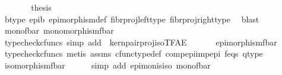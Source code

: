 \begin{isabellebody}
\ \ \ \ \isamarkupfalse%
\ \isamarkupfalse%
\ {\isacharquery}{\kern0pt}thesis\isanewline
\ \ \ \ \ \ \isamarkupfalse%
\ b{\isacharunderscore}{\kern0pt}type\ epi{\isacharunderscore}{\kern0pt}b\ epimorphism{\isacharunderscore}{\kern0pt}def{}\ fibr{\isacharunderscore}{\kern0pt}proj{\isacharunderscore}{\kern0pt}left{\isacharunderscore}{\kern0pt}type\ fibr{\isacharunderscore}{\kern0pt}proj{\isacharunderscore}{\kern0pt}right{\isacharunderscore}{\kern0pt}type\ \isamarkupfalse%
\ blast\isanewline
\ \ \isamarkupfalse%
\isanewline
\ \ \isanewline
\ \ \isamarkupfalse%
\ \isamarkupfalse%
\ mono{\isacharunderscore}{\kern0pt}fbar{\isacharcolon}{\kern0pt}\ {\isachardoublequoteopen}monomorphism{\isacharparenleft}{\kern0pt}f{\isacharunderscore}{\kern0pt}bar{\isacharparenright}{\kern0pt}{\isachardoublequoteclose}\isanewline
\ \ \ \ \isamarkupfalse%
\ {\isacharparenleft}{\kern0pt}typecheck{\isacharunderscore}{\kern0pt}cfuncs{\isacharcomma}{\kern0pt}\ simp\ add{\isacharcolon}{\kern0pt}\ \ kern{\isacharunderscore}{\kern0pt}pair{\isacharunderscore}{\kern0pt}proj{\isacharunderscore}{\kern0pt}iso{\isacharunderscore}{\kern0pt}TFAE{}{\isacharparenright}{\kern0pt}\isanewline
\ \ \isanewline
\ \ \isamarkupfalse%
\ {\isachardoublequoteopen}epimorphism{\isacharparenleft}{\kern0pt}f{\isacharunderscore}{\kern0pt}bar{\isacharparenright}{\kern0pt}{\isachardoublequoteclose}\isanewline
\ \ \ \ \isamarkupfalse%
\ {\isacharparenleft}{\kern0pt}typecheck{\isacharunderscore}{\kern0pt}cfuncs{\isacharcomma}{\kern0pt}\ metis\ assms{\isacharparenleft}{\kern0pt}{}{\isacharparenright}{\kern0pt}\ cfunc{\isacharunderscore}{\kern0pt}type{\isacharunderscore}{\kern0pt}def\ comp{\isacharunderscore}{\kern0pt}epi{\isacharunderscore}{\kern0pt}imp{\isacharunderscore}{\kern0pt}epi\ f{\isacharunderscore}{\kern0pt}eqs\ q{\isacharunderscore}{\kern0pt}type{\isacharparenright}{\kern0pt}\isanewline
\ \ \isanewline
\ \ \isamarkupfalse%
\ \isamarkupfalse%
\ {\isachardoublequoteopen}isomorphism{\isacharparenleft}{\kern0pt}f{\isacharunderscore}{\kern0pt}bar{\isacharparenright}{\kern0pt}{\isachardoublequoteclose}\isanewline
\ \ \ \ \isamarkupfalse%
\ {\isacharparenleft}{\kern0pt}simp\ add{\isacharcolon}{\kern0pt}\ epi{\isacharunderscore}{\kern0pt}mon{\isacharunderscore}{\kern0pt}is{\isacharunderscore}{\kern0pt}iso\ mono{\isacharunderscore}{\kern0pt}fbar{\isacharparenright}{\kern0pt}\isanewline

\end{isabellebody}
